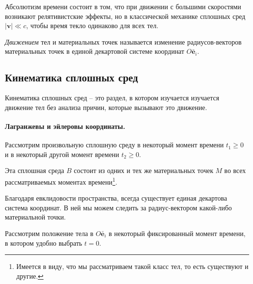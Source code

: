 Абсолютизм времени состоит в том, что при движении с большими скоростями возникают релятивистские 
эффекты, но в классической механике сплошных сред $|\mathbf{v}| \ll c$, чтобы время текло одинаково
для всех тел.


\begin{definition}
  \emph{Движением} тел и материальных точек называется изменение радиусов-векторов материальных точек в
  единой декартовой системе координат $O \bar{\mathbf{e}}_i$.
\end{definition}

%	


\subsection{Кинематика сплошных сред}
\begin{definition}
  Кинематика сплошных сред -- это раздел, в котором изучается изучается движение тел без анализа
  причин, которые вызывают это движение.
\end{definition}

\paragraph{Лагранжевы и эйлеровы координаты.}
\begin{figure}[H]
	\centering
	
\end{figure}

Рассмотрим произвольную сплошную среду в некоторый момент времени $t_1 \geqslant 0$ и в некоторый
другой момент времени $t_2 \geqslant 0$.

Эта сплошная среда $B$ состоит из одних и тех же материальных точек $M$ во всех рассматриваемых 
моментах времени\footnote{Имеется в виду, что мы рассматриваем такой класс тел, то есть существуют
и другие.}.
  
Благодаря евклидовости пространства, всегда существует единая декартова система координат. В
ней мы можем следить за радиус-вектором какой-либо материальной точки.

Рассмотрим положение тела в $O\bar{\mathbf{e}}_i$ в некоторый фиксированный момент времени, 
в котором удобно выбрать $t=0$.

\begin{figure}[H]
	\centering
	
\end{figure}


